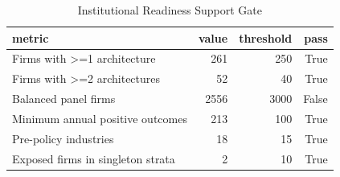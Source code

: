 \begin{table}
\caption{Institutional Readiness Support Gate}
\label{tab:table1_support_gate}
\begin{tabular}{lrrr}
\toprule
metric & value & threshold & pass \\
\midrule
Firms with >=1 architecture & 261 & 250 & True \\
Firms with >=2 architectures & 52 & 40 & True \\
Balanced panel firms & 2556 & 3000 & False \\
Minimum annual positive outcomes & 213 & 100 & True \\
Pre-policy industries & 18 & 15 & True \\
Exposed firms in singleton strata & 2 & 10 & True \\
\bottomrule
\end{tabular}
\end{table}
